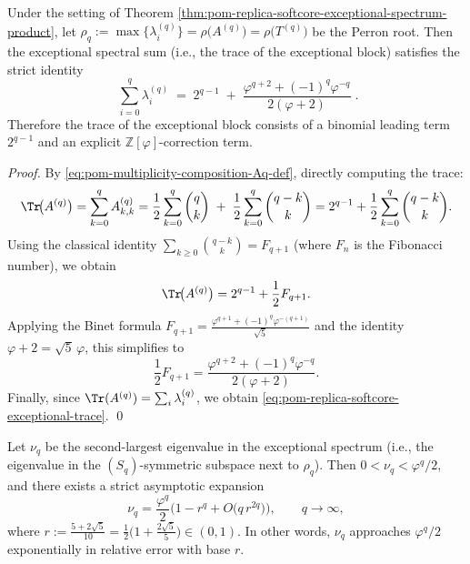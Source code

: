 \begin{theorem}\label{thm:pom-replica-softcore-exceptional-spectrum-trace}
Under the setting of Theorem \ref{thm:pom-replica-softcore-exceptional-spectrum-product}, let
\(
\rho_q:=\max\{\lambda_i^{(q)}\}
=\rho\!\bigl(A^{(q)}\bigr)=\rho\!\bigl(T^{(q)}\bigr)
\)
be the Perron root.
Then the exceptional spectral sum (i.e., the trace of the exceptional block) satisfies the strict identity
\begin{equation}\label{eq:pom-replica-softcore-exceptional-trace}
\boxed{\;
\sum_{i=0}^{q}\lambda_i^{(q)}
\;=\;
2^{q-1}
\;+\;
\frac{\varphi^{q+2}+(-1)^q\varphi^{-q}}{2(\varphi+2)}\; } .
\end{equation}
Therefore the trace of the exceptional block consists of a binomial leading term \(2^{q-1}\) and an explicit \(\mathbb Z[\varphi]\)-correction term.
\end{theorem}
\begin{proof}
By \eqref{eq:pom-multiplicity-composition-Aq-def}, directly computing the trace:
\[
\Tr\!\bigl(A^{(q)}\bigr)
=\sum_{k=0}^{q}A^{(q)}_{k,k}
=\frac12\sum_{k=0}^{q}\binom{q}{k}
\;+\;\frac12\sum_{k=0}^{q}\binom{q-k}{k}
=2^{q-1}+\frac12\sum_{k=0}^{q}\binom{q-k}{k}.
\]
Using the classical identity
\(
\sum_{k\ge 0}\binom{q-k}{k}=F_{q+1}
\)
(where \(F_n\) is the Fibonacci number), we obtain
\[
\Tr\!\bigl(A^{(q)}\bigr)=2^{q-1}+\frac12F_{q+1}.
\]
Applying the Binet formula \(F_{q+1}=\frac{\varphi^{q+1}+(-1)^q\varphi^{-(q+1)}}{\sqrt5}\)
and the identity \(\varphi+2=\sqrt5\,\varphi\), this simplifies to
\[
\frac12F_{q+1}
=\frac{\varphi^{q+2}+(-1)^q\varphi^{-q}}{2(\varphi+2)}.
\]
Finally, since \(\Tr(A^{(q)})=\sum_i\lambda_i^{(q)}\), we obtain \eqref{eq:pom-replica-softcore-exceptional-trace}. \qed
\end{proof}
\begin{theorem}\label{thm:pom-replica-softcore-second-exceptional-eigenvalue-asymptotics}
Let \(\nu_q\) be the second-largest eigenvalue in the exceptional spectrum (i.e., the eigenvalue in the \((S_q)\)-symmetric subspace next to \(\rho_q\)).
Then \(0<\nu_q<\varphi^q/2\), and there exists a strict asymptotic expansion
\begin{equation}\label{eq:pom-replica-softcore-nuq-asymptotics}
\nu_q
=\frac{\varphi^{q}}{2}\Bigg(1-r^{q}
+O\!\bigl(q\,r^{2q}\bigr)\Bigg),
\qquad q\to\infty,
\end{equation}
where
\(
r:=\frac{5+2\sqrt5}{10}
=\frac12\bigl(1+\frac{2\sqrt5}{5}\bigr)\in(0,1)
\).
In other words, \(\nu_q\) approaches \(\varphi^q/2\) exponentially in relative error with base \(r\).
\end{theorem}
